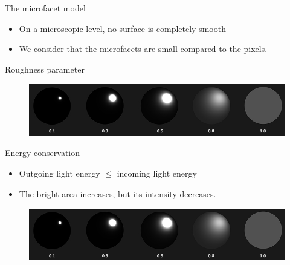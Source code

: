 \documentclass[]{beamer}
\begin{document}

\begin{frame}


  \textcolor{mypink1}{The microfacet model}
\vspace{5mm}

 \begin{itemize}
     \item On a microscopic level, no surface is completely smooth \pause
     \item We consider that the microfacets are small compared to the pixels.
 \end{itemize}





\end{frame}



\begin{frame}


  \textcolor{mypink1}{Roughness parameter}
\vspace{5mm}

 

\begin{figure}[h!]
  \begin{center}
    \includegraphics[height=0.9in]{images/14.jpg}
  \end{center}
\end{figure}


\end{frame}


\begin{frame}


  \textcolor{mypink1}{Energy conservation}
\vspace{5mm}

\begin{itemize}
  \item Outgoing light energy $\leq$ incoming light energy \pause
  \item The bright area increases, but its intensity decreases. \pause
\end{itemize}


\begin{figure}[h!]
  \begin{center}
    \includegraphics[height=0.9in]{images/14.jpg}
  \end{center}
\end{figure}


\end{frame}
\end{document}
